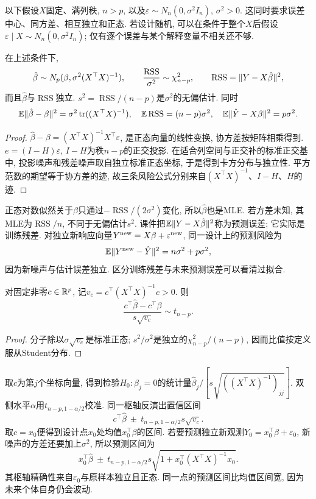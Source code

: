 以下假设$X$固定、满列秩, $n>p$, 以及$\varepsilon\sim N_n(0,\sigma^2I_n)$, $\sigma^2>0$. 这同时要求误差中心、同方差、相互独立和正态. 若设计随机, 可以在条件于整个$X$后假设$\varepsilon\mid X\sim N_n(0,\sigma^2I_n)$; 仅有逐个误差与某个解释变量不相关还不够.

\begin{theorem}[最小二乘的精确分布]
在上述条件下,
\[
 \hat\beta\sim N_p(\beta,\sigma^2(X^\top X)^{-1}),\qquad
 \frac{\operatorname{RSS}}{\sigma^2}\sim\chi_{n-p}^2,
 \qquad \operatorname{RSS}=\lVert Y-X\hat\beta\rVert^2,
\]
而且$\hat\beta$与$\operatorname{RSS}$独立. $s^2=\operatorname{RSS}/(n-p)$是$\sigma^2$的无偏估计. 同时
\[
 \mathbb E\lVert \hat\beta-\beta\rVert^2=\sigma^2\operatorname{tr}((X^\top X)^{-1}),\quad
 \mathbb E\operatorname{RSS}=(n-p)\sigma^2,\quad
 \mathbb E\lVert \hat Y-X\beta\rVert^2=p\sigma^2.
\]
\end{theorem}
\begin{proof}
$\hat\beta-\beta=(X^\top X)^{-1}X^\top\varepsilon$, 是正态向量的线性变换, 协方差按矩阵相乘得到. $e=(I-H)\varepsilon$, $I-H$为秩$n-p$的正交投影. 在适合列空间与正交补的标准正交基中, 投影噪声和残差噪声取自独立标准正态坐标, 于是得到卡方分布与独立性. 平方范数的期望等于协方差的迹, 故三条风险公式分别来自$(X^\top X)^{-1}$、$I-H$、$H$的迹.
\end{proof}
正态对数似然关于$\beta$只通过$-\operatorname{RSS}/(2\sigma^2)$变化, 所以$\hat\beta$也是MLE. 若方差未知, 其MLE为$\operatorname{RSS}/n$, 不同于无偏估计$s^2$. 课件把$\mathbb E\lVert Y-X\hat\beta\rVert^2$称为预测误差; 它实际是训练残差. 对独立新响应向量$Y^{\rm new}=X\beta+\varepsilon^{\rm new}$, 同一设计上的预测风险为
\[
 \mathbb E\lVert Y^{\rm new}-\hat Y\rVert^2=n\sigma^2+p\sigma^2,
\]
因为新噪声与估计误差独立. 区分训练残差与未来预测误差可以看清过拟合.

\begin{proposition}[线性对比的$t$枢轴]
对固定非零$c\in\mathbb R^p$, 记$v_c=c^\top(X^\top X)^{-1}c>0$. 则
\[
 \frac{c^\top\hat\beta-c^\top\beta}{s\sqrt{v_c}}\sim t_{n-p}.
\]
\end{proposition}
\begin{proof}
分子除以$\sigma\sqrt{v_c}$是标准正态; $s^2/\sigma^2$是独立的$\chi_{n-p}^2/(n-p)$, 因而比值按定义服从Student分布.
\end{proof}
取$c$为第$j$个坐标向量, 得到检验$H_0:\beta_j=0$的统计量$\hat\beta_j/[s\sqrt{((X^\top X)^{-1})_{jj}}]$. 双侧水平$\alpha$用$t_{n-p,1-\alpha/2}$校准. 同一枢轴反演出置信区间
\[
 c^\top\hat\beta\ \pm\ t_{n-p,1-\alpha/2}s\sqrt{v_c}.
\]
取$c=x_0$便得到设计点$x_0$处均值$x_0^\top\beta$的区间. 若要预测独立新观测$Y_0=x_0^\top\beta+\varepsilon_0$, 新噪声的方差还要加上$\sigma^2$, 所以预测区间为
\[
 x_0^\top\hat\beta\ \pm\ t_{n-p,1-\alpha/2}s
 \sqrt{1+x_0^\top(X^\top X)^{-1}x_0}.
\]
其枢轴精确性来自$\varepsilon_0$与原样本独立且正态. 同一点的预测区间比均值区间宽, 因为未来个体自身仍会波动.

